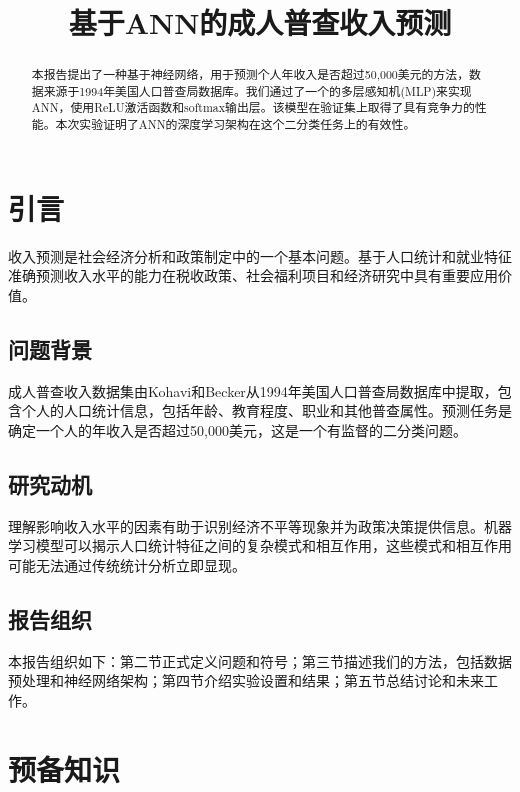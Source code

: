 \documentclass[conference]{IEEEtran}
\begin{document}
\title{基于ANN的成人普查收入预测}

\author{
}

\maketitle

\begin{abstract}
本报告提出了一种基于神经网络，用于预测个人年收入是否超过50,000美元的方法，数据来源于1994年美国人口普查局数据库。我们通过了一个的多层感知机(MLP)来实现ANN，使用ReLU激活函数和softmax输出层。该模型在验证集上取得了具有竞争力的性能。本次实验证明了ANN的深度学习架构在这个二分类任务上的有效性。
\end{abstract}

\section{引言}

收入预测是社会经济分析和政策制定中的一个基本问题。基于人口统计和就业特征准确预测收入水平的能力在税收政策、社会福利项目和经济研究中具有重要应用价值。

\subsection{问题背景}
成人普查收入数据集由Kohavi和Becker从1994年美国人口普查局数据库中提取，包含个人的人口统计信息，包括年龄、教育程度、职业和其他普查属性。预测任务是确定一个人的年收入是否超过50,000美元，这是一个有监督的二分类问题。

\subsection{研究动机}
理解影响收入水平的因素有助于识别经济不平等现象并为政策决策提供信息。机器学习模型可以揭示人口统计特征之间的复杂模式和相互作用，这些模式和相互作用可能无法通过传统统计分析立即显现。

\subsection{报告组织}
本报告组织如下：第二节正式定义问题和符号；第三节描述我们的方法，包括数据预处理和神经网络架构；第四节介绍实验设置和结果；第五节总结讨论和未来工作。

\section{预备知识}
\end{document}
